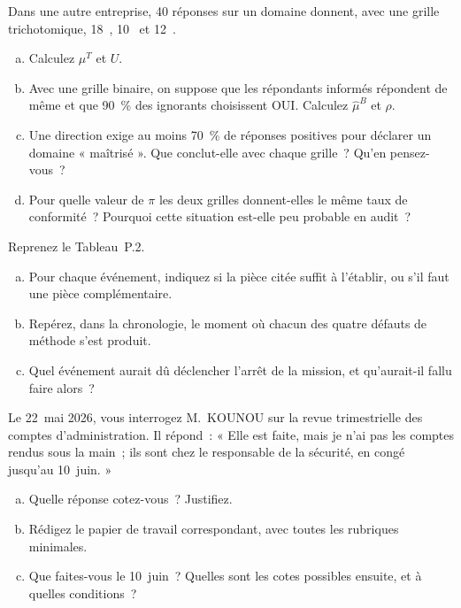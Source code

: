 \begin{boxexo}[title={\ding{45}\quad Exercice~P.4. Le coût de la case forcée \niveaumoyen}]
Dans une autre entreprise, 40 réponses sur un domaine donnent, avec une
grille trichotomique, 18~\OUI{}, 10~\NON{} et 12~\NEK{}.
\begin{enumerate}[(a)]
    \item Calculez $\mu^{T}$ et $U$.
    \item Avec une grille binaire, on suppose que les répondants informés
          répondent de même et que 90~\% des ignorants choisissent OUI.
          Calculez $\hat\mu^{B}$ et $\rho$.
    \item Une direction exige au moins 70~\% de réponses positives pour
          déclarer un domaine « maîtrisé ». Que conclut-elle avec chaque
          grille~? Qu'en pensez-vous~?
    \item Pour quelle valeur de $\pi$ les deux grilles donnent-elles le même
          taux de conformité~? Pourquoi cette situation est-elle peu
          probable en audit~?
\end{enumerate}
\end{boxexo}

\begin{boxexo}[title={\ding{45}\quad Exercice~P.5. Les traces de la chronologie \niveaumoyen}]
Reprenez le Tableau~P.2.
\begin{enumerate}[(a)]
    \item Pour chaque événement, indiquez si la pièce citée suffit à
          l'établir, ou s'il faut une pièce complémentaire.
    \item Repérez, dans la chronologie, le moment où chacun des quatre
          défauts de méthode s'est produit.
    \item Quel événement aurait dû déclencher l'arrêt de la mission, et
          qu'aurait-il fallu faire alors~?
\end{enumerate}
\end{boxexo}

\begin{boxexo}[title={\ding{45}\quad Exercice~P.6. Rédiger un papier de travail \niveaumoyen}]
Le 22~mai 2026, vous interrogez M.~KOUNOU sur la revue trimestrielle des
comptes d'administration. Il répond~: « Elle est faite, mais je n'ai pas
les comptes rendus sous la main~; ils sont chez le responsable de la
sécurité, en congé jusqu'au 10~juin. »
\begin{enumerate}[(a)]
    \item Quelle réponse cotez-vous~? Justifiez.
    \item Rédigez le papier de travail correspondant, avec toutes les
          rubriques minimales.
    \item Que faites-vous le 10~juin~? Quelles sont les cotes possibles
          ensuite, et à quelles conditions~?
\end{enumerate}
\end{boxexo}

